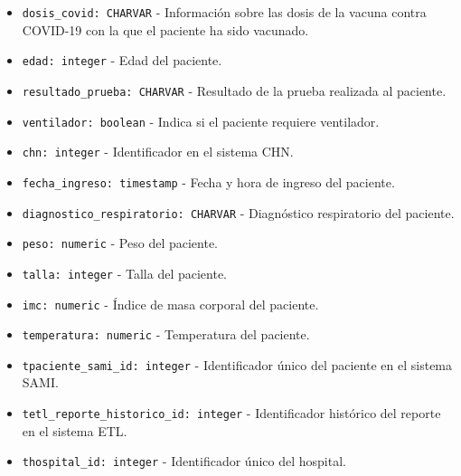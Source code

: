 \begin{itemize}
\begin{itemize}
\begin{itemize}
                \item \texttt{dosis\_covid: CHARVAR} - Información sobre las dosis de la vacuna contra COVID-19 con la que el paciente ha sido vacunado.
                
                \item \texttt{edad: integer} - Edad del paciente.
                
                \item \texttt{resultado\_prueba: CHARVAR} - Resultado de la prueba realizada al paciente.
                
                \item \texttt{ventilador: boolean} - Indica si el paciente requiere ventilador.
                
                \item \texttt{chn: integer} - Identificador en el sistema CHN.
                
                \item \texttt{fecha\_ingreso: timestamp} - Fecha y hora de ingreso del paciente.
                
                \item \texttt{diagnostico\_respiratorio: CHARVAR} - Diagnóstico respiratorio del paciente.
                
                \item \texttt{peso: numeric} - Peso del paciente.
                
                \item \texttt{talla: integer} - Talla del paciente.
                
                \item \texttt{imc: numeric} - Índice de masa corporal del paciente.
                
                \item \texttt{temperatura: numeric} - Temperatura del paciente.
                
                \item \texttt{tpaciente\_sami\_id: integer} - Identificador único del paciente en el sistema SAMI.
                
                \item \texttt{tetl\_reporte\_historico\_id: integer} - Identificador histórico del reporte en el sistema ETL.
                
                \item \texttt{thospital\_id: integer} - Identificador único del hospital.
                

\end{itemize}
\end{itemize}
\end{itemize}
